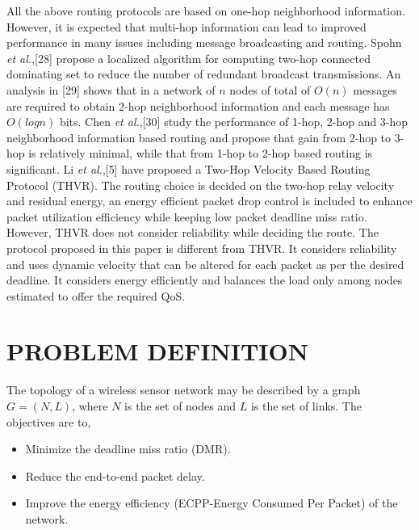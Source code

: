 \documentclass[fleqn,twoside]{article}
\begin{document}
\vskip 2mm
All the above routing protocols are based on one-hop neighborhood information. However, it is expected that multi-hop information can lead to improved performance in many issues including message broadcasting and routing. Spohn \emph{et al.},[28] propose a localized algorithm for computing two-hop connected dominating set to reduce the number of redundant broadcast transmissions. An analysis in [29] shows that in a network of $n$ nodes of total of $O(n)$ messages are required to obtain 2-hop neighborhood information and each message has $O(log n)$ bits. 
Chen \emph{et al.},[30] study the performance of 1-hop, 2-hop and 3-hop neighborhood information based
routing and propose that gain from 2-hop to 3-hop is relatively minimal, while that from 1-hop to 2-hop based routing is significant.
\vskip 2mm
Li \emph{et al.},[5] have proposed a Two-Hop Velocity Based Routing Protocol (THVR). The routing choice is decided on the two-hop relay velocity and residual energy, an energy efficient packet drop control is included to enhance packet utilization efficiency while keeping low packet deadline miss ratio. However, THVR does not consider reliability while deciding the route. The protocol proposed in this paper is different from THVR. It considers reliability and uses dynamic velocity that can be altered for each packet as per the desired deadline. It considers energy efficiently and balances the load only among nodes estimated to offer the required QoS.
 \section{PROBLEM DEFINITION}
\label{section:pd}
The topology of a wireless sensor network may be described by a graph $G=(N,L)$, where $N$ is the set of nodes and $L$ is the set of links. The objectives are to,
\begin{itemize}
\item Minimize the deadline miss ratio (DMR).
\item Reduce the end-to-end packet delay.
\item Improve the energy efficiency (ECPP-Energy Consumed Per Packet) of the network.
\end{itemize}
\end{document}
